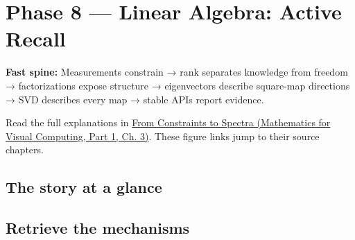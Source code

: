 \hypertarget{appendix-932cf7182ff1}{}\label{referencestart:appendix-932cf7182ff1}
\section{Phase 8 --- Linear Algebra: Active Recall}\label{appendix-932cf7182ff1-phase-8-linear-algebra-active-recall}

\hypertarget{appendix-932cf7182ff1-phase-8-linear-algebra-active-recall}{}

\textbf{Fast spine:} Measurements constrain → rank separates knowledge from freedom → factorizations expose structure → eigenvectors describe square-map directions → SVD describes every map → stable APIs report evidence.

Read the full explanations in \href{../02-Mathematics-for-Visual-Computing-P01/main.pdf\#01-foundations-i-ch019-the-graphics-problem-hiding-inside-a-matrix-equation}{From Constraints to Spectra (Mathematics for Visual Computing, Part 1, Ch. 3)}. These figure links jump to their source chapters.

\subsection{The story at a glance}\label{appendix-932cf7182ff1-the-story-at-a-glance}

\hypertarget{appendix-932cf7182ff1-the-story-at-a-glance}{}


\subsection{Retrieve the mechanisms}\label{appendix-932cf7182ff1-retrieve-the-mechanisms}

\hypertarget{appendix-932cf7182ff1-retrieve-the-mechanisms}{}

